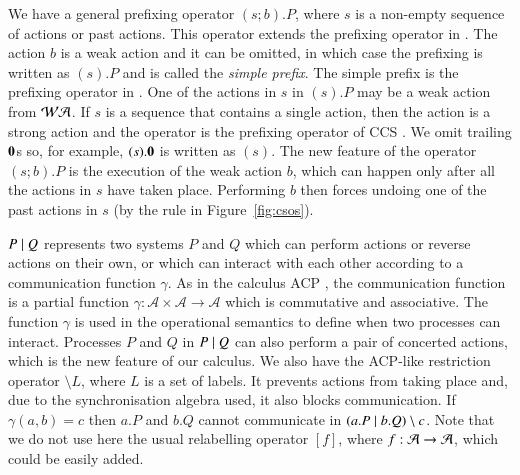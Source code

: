 We have a general prefixing operator
$(s;b).P$, where $s$ is a non-empty sequence of actions or past actions. This operator
extends the prefixing operator in \cite{Irek2012}. The action $b$ is a weak action
and it can be omitted, in which case the prefixing is written as $(s).P$ and is called the
\emph{simple prefix}. The simple prefix is the prefixing operator in \cite{Irek2012}. 
One of the actions in $s$ in $(s).P$ may be a weak action from $\mathcal{WA}$. If $s$ is a sequence that contains   
a single action, then the action is a strong action and the operator 
is the prefixing operator of CCS \cite{Milner1980}.
We omit trailing $\mathbf{0}$s so, for example, $(s).\mathbf{0}$ is written as $(s)$.
%
%
%
%
The new feature of the operator $(s;b).P$ is the execution of the weak action $b$, which
can happen only after all the actions in $s$ have taken place. Performing $b$ then forces
undoing one of the past actions in $s$ (by the  rule in Figure~\ref{fig:csos}).

$P\; \vert \; Q$ represents two systems $P$ and $Q$ which can perform actions or reverse actions on
their own, or which can interact with each other according to a communication function
$\gamma$. As in the calculus ACP \cite{ACPBook}, the communication function is a partial function 
$\gamma: \mathcal A \times \mathcal A \rightarrow \mathcal A$ which is commutative and associative. The function
$\gamma$ is used in the operational semantics to define when two processes can interact. Processes 
$P$ and $Q$ in $P\; \vert \; Q$ can also perform a pair of concerted actions,
which is the new feature of our calculus.  We also have the ACP-like restriction operator 
$\setminus L$, where $L$ is a set of labels. It prevents actions from taking place and, due to 
the synchronisation algebra used, it also blocks communication. If $\gamma(a,b)=c$ then $a.P$ and $b.Q$
cannot communicate in $(a.P\; \vert \; b.Q)\setminus c$.
Note that we do not use here the usual relabelling 
operator $[f]$, where $f: \mathcal{A} \rightarrow \mathcal{A}$, which could be easily added.

